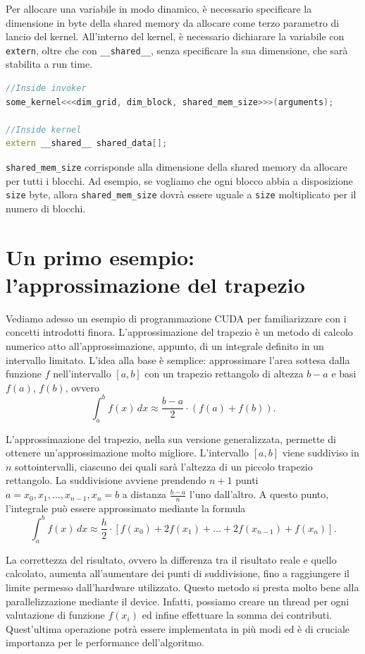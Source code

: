 Per allocare una variabile in modo dinamico, è necessario specificare la dimensione in byte della shared memory da allocare come terzo parametro di lancio del kernel.
All'interno del kernel, è necessario dichiarare la variabile con \texttt{extern}, oltre che con \texttt{\_\_shared\_\_}, senza specificare la sua dimensione, che sarà stabilita a run time.

\begin{lstlisting}[language=C++, numbers=none]
//Inside invoker
some_kernel<<<dim_grid, dim_block, shared_mem_size>>>(arguments);

//Inside kernel
extern __shared__ shared_data[];
\end{lstlisting}

\begin{note}{}
    \texttt{shared\_mem\_size} corrisponde alla dimensione della shared memory da allocare per tutti i blocchi.
    Ad esempio, se vogliamo che ogni blocco abbia a disposizione \texttt{size} byte, allora \texttt{shared\_mem\_size} dovrà essere uguale a \texttt{size} moltiplicato per il numero di blocchi.
\end{note}

\section{Un primo esempio: l'approssimazione del trapezio}
Vediamo adesso un esempio di programmazione CUDA per familiarizzare con i concetti introdotti finora. 
L'approssimazione del trapezio è un metodo di calcolo numerico atto all'approssimazione, appunto, di un integrale definito in un intervallo limitato.
L'idea alla base è semplice: approssimare l'area sottesa dalla funzione \(f\) nell'intervallo \([a,b]\) con un trapezio rettangolo di altezza \(b-a\) e basi \(f(a)\), \(f(b)\), ovvero
\[\int_{a}^{b}f(x)\,dx\approx \frac{b-a}{2}\cdot (f(a) + f(b)).\]

L'approssimazione del trapezio, nella sua versione generalizzata, permette di ottenere un'approssimazione molto migliore.
L'intervallo \([a,b]\) viene suddiviso in \(n\) sottointervalli, ciascuno dei quali sarà l'altezza di un piccolo trapezio rettangolo.
La suddivisione avviene prendendo \(n+1\) punti \(a=x_0,x_1,\ldots, x_{n-1}, x_{n}=b\) a distanza \(\frac{b-a}{n}\) l'uno dall'altro. 
A questo punto, l'integrale può essere approssimato mediante la formula
\[\int_{a}^{b}f(x)\,dx\approx \frac{h}{2}\cdot\left[f(x_0)+2f(x_1)+\ldots+2f(x_{n-1})+f(x_n)\right].\]

La correttezza del risultato, ovvero la differenza tra il risultato reale e quello calcolato, aumenta all'aumentare dei punti di suddivisione, fino a raggiungere il limite permesso dall'hardware utilizzato.
Questo metodo si presta molto bene alla parallelizzazione mediante il device. 
Infatti, possiamo creare un thread per ogni valutazione di funzione \(f(x_i)\) ed infine effettuare la somma dei contributi.
Quest'ultima operazione potrà essere implementata in più modi ed è di cruciale importanza per le performance dell'algoritmo.

